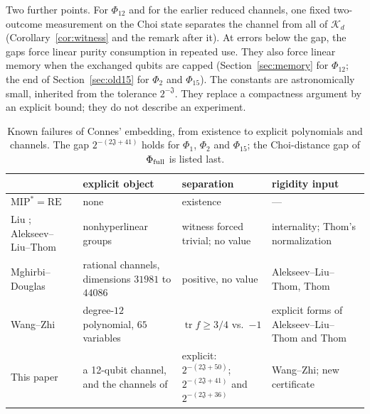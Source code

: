 \documentclass[11pt]{article}
\newcommand{\tr}{\operatorname{tr}}
\newcommand{\K}{\mathcal K}
\newcommand{\cJ}{\mathfrak J}
\begin{document}
Two further points.  For $\Phi_{12}$ and for the earlier reduced channels, one fixed two-outcome measurement on the Choi state separates the channel from all of $\K_d$ (Corollary~\ref{cor:witness} and the remark after it).  At errors below the gap, the gaps force linear purity consumption in repeated use.  They also force linear memory when the exchanged qubits are capped (Section~\ref{sec:memory} for $\Phi_{12}$; the end of Section~\ref{sec:old15} for $\Phi_2$ and $\Phi_{15}$).  The constants are astronomically small, inherited from the tolerance $2^{-\cJ}$.  They replace a compactness argument by an explicit bound; they do not describe an experiment.

\begin{table}[b]
\centering
\small
\begin{tabular}{@{}>{\raggedright\arraybackslash}p{}>{\raggedright\arraybackslash}p{}>{\raggedright\arraybackslash}p{}>{\raggedright\arraybackslash}p{}@{}}
\toprule
 & explicit object & separation & rigidity input\\
\midrule
$\mathrm{MIP}^*=\mathrm{RE}$ \cite{JiEtAl20} & none & existence & ---\\
Liu \cite{Liu26}; Alekseev--Liu--Thom \cite{AlekseevLiuThom26} & nonhyperlinear groups & witness forced trivial; no value & internality; Thom's normalization\\
Mghirbi--Douglas \cite{MghirbiDouglasV1} & rational channels, dimensions $31981$ to $44086$ & positive, no value & Alekseev--Liu--Thom, Thom\\
Wang--Zhi \cite{WangZhi26} & degree-$12$ polynomial, $65$ variables & $\tr f\ge3/4$ vs.\ $-1$ & explicit forms of Alekseev--Liu--Thom and Thom\\
This paper & a 12-qubit channel, and the channels of \cite{MghirbiDouglasV1} & explicit: $2^{-(2\cJ+50)}$; $2^{-(2\cJ+41)}$ and $2^{-(2\cJ+36)}$ & Wang--Zhi; new certificate\\
\bottomrule
\end{tabular}
\caption{Known failures of Connes' embedding, from existence to explicit polynomials and channels.  The gap $2^{-(2\cJ+41)}$ holds for $\Phi_1$, $\Phi_2$ and $\Phi_{15}$; the Choi-distance gap of $\Phi_{\rm full}$ is listed last.}
\label{tab:positioning}
\end{table}
\end{document}
